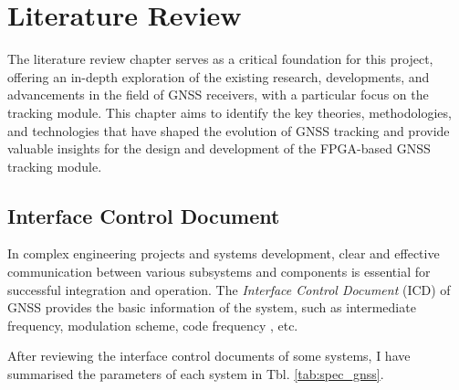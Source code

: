 \chapter{Literature Review}

The literature review chapter serves as a critical foundation for this project, offering an in-depth exploration of the existing research, developments, and advancements in the field of GNSS receivers, with a particular focus on the tracking module. This chapter aims to identify the key theories, methodologies, and technologies that have shaped the evolution of GNSS tracking and provide valuable insights for the design and development of the FPGA-based GNSS tracking module.

\section{Interface Control Document\texorpdfstring{\cite{RN170, RN171, RN172, RN174, RN173, RN175}}{}}
In complex engineering projects and systems development, clear and effective communication between various subsystems and components is essential for successful integration and operation. The \textit{Interface Control Document} (ICD) of GNSS provides the basic information of the system, such as intermediate frequency, modulation scheme, code frequency , etc. 

After reviewing the interface control documents of some systems, I have summarised the parameters of each system in Tbl. \ref{tab:spec_gnss}. 


